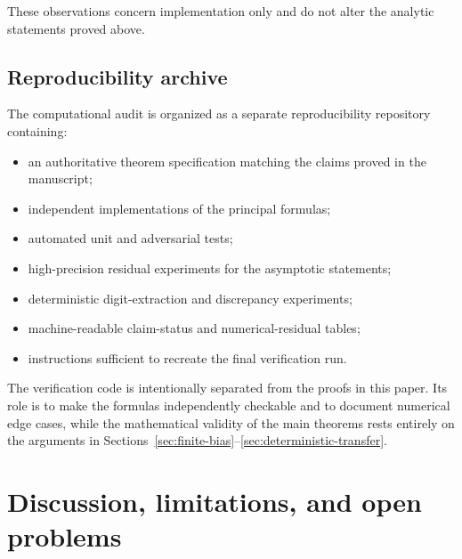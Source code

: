 \documentclass[11pt]{article}
\theoremstyle{definition}
\theoremstyle{remark}
\begin{document}
These observations concern implementation only and do not alter the
analytic statements proved above.


\subsection{Reproducibility archive}
\label{subsec:reproducibility-archive}

The computational audit is organized as a separate reproducibility
repository containing:

\begin{itemize}
    \item an authoritative theorem specification matching the claims
    proved in the manuscript;

    \item independent implementations of the principal formulas;

    \item automated unit and adversarial tests;

    \item high-precision residual experiments for the asymptotic
    statements;

    \item deterministic digit-extraction and discrepancy experiments;

    \item machine-readable claim-status and numerical-residual tables;

    \item instructions sufficient to recreate the final verification
    run.
\end{itemize}

The verification code is intentionally separated from the proofs in
this paper.  Its role is to make the formulas independently checkable
and to document numerical edge cases, while the mathematical validity
of the main theorems rests entirely on the arguments in
Sections~\ref{sec:finite-bias}--\ref{sec:deterministic-transfer}.



\section{Discussion, limitations, and open problems}
\label{sec:discussion}
\end{document}
